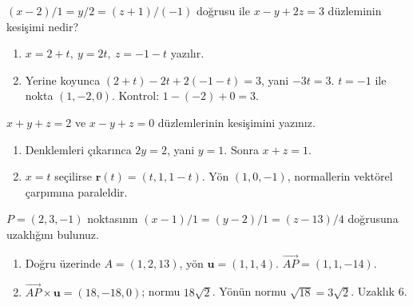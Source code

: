 \begin{tcolorbox}[title={Örnek 2.6 | Dersteki doğru-düzlem kesişimi},colframe=accent]\((x-2)/1=y/2=(z+1)/(-1)\) doğrusu ile \(x-y+2z=3\) düzleminin kesişimi nedir?
\par{}\end{tcolorbox}
\begin{tcolorbox}[title={Adım adım çözüm},colback=green!3!white,colframe=green]\begin{enumerate}
\item \(x=2+t,\ y=2t,\ z=-1-t\) yazılır.
\item Yerine koyunca \((2+t)-2t+2(-1-t)=3\), yani \(-3t=3\). \(t=-1\) ile nokta \((1,-2,0)\). Kontrol: \(1-(-2)+0=3\).
\end{enumerate}\end{tcolorbox}
\begin{tcolorbox}[title={Örnek 2.7 | İki düzlemin arakesiti},colframe=accent]\(x+y+z=2\) ve \(x-y+z=0\) düzlemlerinin kesişimini yazınız.
\par\vspace{1mm}{\scriptsize\sffamily Pekiştirme}\end{tcolorbox}
\begin{tcolorbox}[title={Adım adım çözüm},colback=green!3!white,colframe=green]\begin{enumerate}
\item Denklemleri çıkarınca \(2y=2\), yani \(y=1\). Sonra \(x+z=1\).
\item \(x=t\) seçilirse \(\mathbf r(t)=(t,1,1-t)\). Yön \((1,0,-1)\), normallerin vektörel çarpımına paraleldir.
\end{enumerate}\end{tcolorbox}
\begin{tcolorbox}[title={Örnek 2.8 | Tahtadaki nokta-doğru uzaklığı},colframe=accent]\(P=(2,3,-1)\) noktasının \((x-1)/1=(y-2)/1=(z-13)/4\) doğrusuna uzaklığını bulunuz.
\par{}\end{tcolorbox}
\begin{tcolorbox}[title={Adım adım çözüm},colback=green!3!white,colframe=green]\begin{enumerate}
\item Doğru üzerinde \(A=(1,2,13)\), yön \(\mathbf u=(1,1,4)\). \(\overrightarrow{AP}=(1,1,-14)\).
\item \(\overrightarrow{AP}\times\mathbf u=(18,-18,0)\); normu \(18\sqrt2\). Yönün normu \(\sqrt{18}=3\sqrt2\). Uzaklık 6.
\end{enumerate}\end{tcolorbox}
